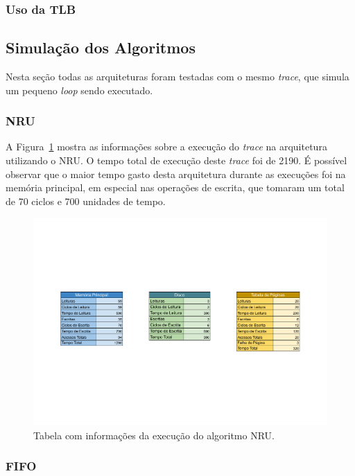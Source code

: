 \documentclass[
	12pt,				%
	oneside,   	        %
	a4paper,			%
	english,			%
	french,				%
	spanish,			%
	brazil,				%
	]{pacotes/abntex2}
\begin{document}
\subsubsection{Uso da TLB}
\label{subsubsec:tlb-arch8}

\subsection{Simulação dos Algoritmos}
\label{subsec:simulate}

Nesta seção todas as arquiteturas foram testadas com o mesmo \textit{trace}, que simula um pequeno \textit{loop} sendo executado.

\subsubsection{NRU}
\label{subsubsec:nru}

A Figura~\ref{fig:nru} mostra as informações sobre a execução do \textit{trace} na arquitetura utilizando o NRU. O tempo total de execução deste \textit{trace} foi de 2190.
É possível observar que o maior tempo gasto desta arquitetura durante as execuções foi na memória principal, em especial nas operações de escrita, que tomaram um total de 70 ciclos e 700 unidades de tempo.

\begin{figure}[H]
  \centering
  \includegraphics[scale=0.5]{figuras/NRU-TLB(none).pdf}
  \caption{Tabela com informações da execução do algoritmo NRU.}
  \label{fig:nru}
\end{figure}

\subsubsection{FIFO}
\label{subsubsec:fifo}
\end{document}
